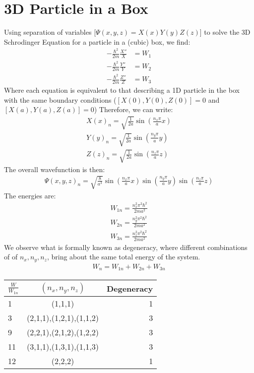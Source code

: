\documentclass{article}
\numberwithin{equation}{section}
\begin{document}

\section*{3D Particle in a Box}

Using separation of variables [$\Psi(x,y,z)=X(x)Y(y)Z(z)$] to solve the 3D Schrodinger Equation for a particle in a (cubic) box, we find:
\begin{align*}
	-\frac{\hbar^2}{2m}\frac{X''}{X} &= W_1
\\	-\frac{\hbar^2}{2m}\frac{Y''}{Y} &= W_2
\\	-\frac{\hbar^2}{2m}\frac{Z''}{Z} &= W_3
\end{align*}
Where each equation is equivalent to that describing a 1D particle in the box with the same boundary conditions ($[X(0),Y(0),Z(0)]=0$ and $[X(a),Y(a),Z(a)]=0$) Therefore, we can write:
\begin{align*}
	X(x)_{n}=\sqrt{\frac{1}{2a}}\sin (\frac{n_x \pi}{a}x)
\\	Y(y)_{n}=\sqrt{\frac{1}{2a}}\sin (\frac{n_y \pi}{a}y)
\\	Z(z)_{n}=\sqrt{\frac{1}{2a}}\sin (\frac{n_z \pi}{a}z)
\end{align*}
The overall wavefunction is then:
\begin{align*}
	\Psi(x,y,z)_{n}=\sqrt{\frac{8}{a^3}}\sin (\frac{n_x \pi}{a}x)\sin (\frac{n_y \pi}{a}y)\sin (\frac{n_z \pi}{a}z)
\end{align*}
The energies are:
\begin{align*}
	W_{1n}=\frac{n_x^2\pi^2\hbar^2}{2ma^2}
\\	W_{2n}=\frac{n_y^2\pi^2\hbar^2}{2ma^2}
\\	W_{3n}=\frac{n_z^2\pi^2\hbar^2}{2ma^2}
\end{align*}
We observe what is formally known as degeneracy, where different combinations of of $n_x,n_y,n_z$, bring about the same total energy of the system.
\begin{align*}
	W_{n}=W_{1n}+W_{2n}+W_{3n}
\end{align*}

\begin{center}
\begin{tabular}{| l |c |r |}
  \hline
  $\frac{W}{W_{1n}}$ & $(n_x,n_y,n_z)$ & Degeneracy \\
  \hline
  1 & (1,1,1) & 1 \\ \hline
  3 & (2,1,1),(1,2,1),(1,1,2) & 3 \\ \hline
  9 & (2,2,1),(2,1,2),(1,2,2) & 3 \\ \hline
  11 & (3,1,1),(1,3,1),(1,1,3) & 3 \\ \hline
  12 & (2,2,2) & 1 \\ \hline
\end{tabular}
\end{center}
\end{document}
